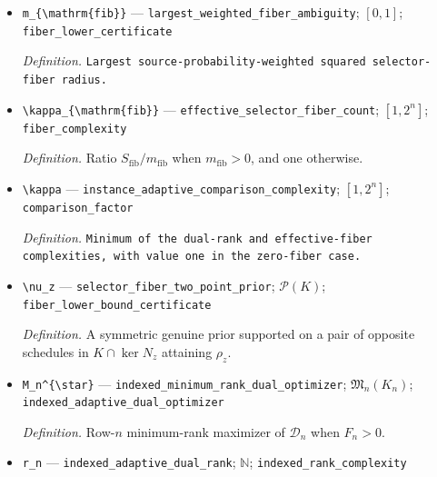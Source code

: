 \documentclass{article}
\begin{document}
\begin{itemize}
  \item \texttt{m\_\allowbreak{}\{\textbackslash{}\allowbreak{}mathrm\{fib\}\allowbreak{}\}\allowbreak{}} --- \texttt{largest\_\allowbreak{}weighted\_\allowbreak{}fiber\_\allowbreak{}ambiguity}; \([0,1]\); \texttt{fiber\_\allowbreak{}lower\_\allowbreak{}certificate}
  \par\smallskip\noindent\emph{Definition.} \texttt{Largest source-\allowbreak{}probability-\allowbreak{}weighted squared selector-\allowbreak{}fiber radius.}
  \item \texttt{\textbackslash{}\allowbreak{}kappa\_\allowbreak{}\{\textbackslash{}\allowbreak{}mathrm\{fib\}\allowbreak{}\}\allowbreak{}} --- \texttt{effective\_\allowbreak{}selector\_\allowbreak{}fiber\_\allowbreak{}count}; \([1,2^n]\); \texttt{fiber\_\allowbreak{}complexity}
  \par\smallskip\noindent\emph{Definition.} Ratio \(S_{\mathrm{fib}}/m_{\mathrm{fib}}\) when \(m_{\mathrm{fib}}>0\), and one otherwise.
  \item \texttt{\textbackslash{}\allowbreak{}kappa} --- \texttt{instance\_\allowbreak{}adaptive\_\allowbreak{}comparison\_\allowbreak{}complexity}; \([1,2^n]\); \texttt{comparison\_\allowbreak{}factor}
  \par\smallskip\noindent\emph{Definition.} \texttt{Minimum of the dual-\allowbreak{}rank and effective-\allowbreak{}fiber complexities,\allowbreak{} with value one in the zero-\allowbreak{}fiber case.}
  \item \texttt{\textbackslash{}\allowbreak{}nu\_\allowbreak{}z} --- \texttt{selector\_\allowbreak{}fiber\_\allowbreak{}two\_\allowbreak{}point\_\allowbreak{}prior}; \(\mathcal P(K)\); \texttt{fiber\_\allowbreak{}lower\_\allowbreak{}bound\_\allowbreak{}certificate}
  \par\smallskip\noindent\emph{Definition.} A symmetric genuine prior supported on a pair of opposite schedules in \(K\cap\ker N_z\) attaining \(\rho_z\).
  \item \texttt{M\_\allowbreak{}n\textasciicircum{}\{\textbackslash{}\allowbreak{}star\}\allowbreak{}} --- \texttt{indexed\_\allowbreak{}minimum\_\allowbreak{}rank\_\allowbreak{}dual\_\allowbreak{}optimizer}; \(\mathfrak M_n(K_n)\); \texttt{indexed\_\allowbreak{}adaptive\_\allowbreak{}dual\_\allowbreak{}optimizer}
  \par\smallskip\noindent\emph{Definition.} Row-\(n\) minimum-rank maximizer of \(\mathcal D_n\) when \(F_n>0\).
  \item \texttt{r\_\allowbreak{}n} --- \texttt{indexed\_\allowbreak{}adaptive\_\allowbreak{}dual\_\allowbreak{}rank}; \(\mathbb N\); \texttt{indexed\_\allowbreak{}rank\_\allowbreak{}complexity}

\end{itemize}
\end{document}
